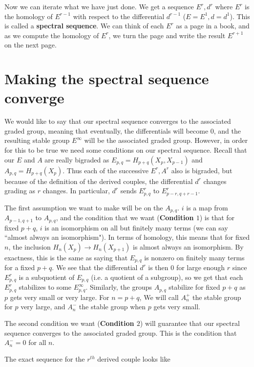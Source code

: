 \documentclass[12pt,oneside]{amsart}
\begin{document}
Now we can iterate what we have just done. We get a sequence $E^r,d^r$ where $E^r$ is the homology of $E^{r-1}$ with respect to the differential $d^{r-1}$ ($E = E^1,d = d^1$). This is called a \textbf{spectral sequence}. We can think of each $E^r$ as a page in a book, and as we compute the homology of $E^r$, we turn the page and write the result $E^{r+1}$ on the next page.


\section{Making the spectral sequence converge}
We would like to say that our spectral sequence converges to the associated graded group, meaning that eventually, the differentials will become $0$, and the resulting stable group $E^\infty$ will be the associated graded group. However, in order for this to be true we need some conditions on our spectral sequence. Recall that our $E$ and $A$ are really bigraded as $E_{p,q} = H_{p+q}(X_p,X_{p-1})$ and $A_{p,q} = H_{p+q}(X_p)$. Thus each of the successive $E^r,A^r$ also is bigraded, but because of the definition of the derived couples, the differential $d^r$ changes grading as $r$ changes. In particular, $d^r$ sends $E^r_{p,q}$ to $E^r_{p-r,q+r-1}$.

The first assumption we want to make will be on the $A_{p,q}$. $i$ is a map from $A_{p-1,q+1}$ to $A_{p,q}$, and the condition that we want (\textbf{Condition $1$}) is that for fixed $p+q$, $i$ is an isomorphism on all but finitely many terms (we can say ``almost always an isomorphism"). In terms of homology, this means that for fixed $n$, the inclusion $H_n(X_p) \to H_n(X_{p+1})$ is almost always an isomorphism. By exactness, this is the same as saying that $E_{p,q}$ is nonzero on finitely many terms for a fixed $p+q$. 
We see that the differential $d^r$ is then $0$ for large enough $r$ since $E^r_{p,q}$ is a subquotient of $E_{p,q}$ (i.e. a quotient of a subgroup), so we get that each $E^r_{p,q}$ stabilizes to some $E^\infty_{p,q}$. Similarly, the groups $A_{p,q}$ stabilize for fixed $p+q$ as $p$ gets very small or very large. For $n = p+q$, We will call $A_n^+$ the stable group for $p$ very large, and $A_n^-$ the stable group when $p$ gets very small.

The second condition we want (\textbf{Condition $2$}) will guarantee that our spectral sequence converges to the associated graded group. This is the condition that $A_n^- = 0$ for all $n$.

The exact sequence for the $r^{th}$ derived couple looks like
\end{document}
